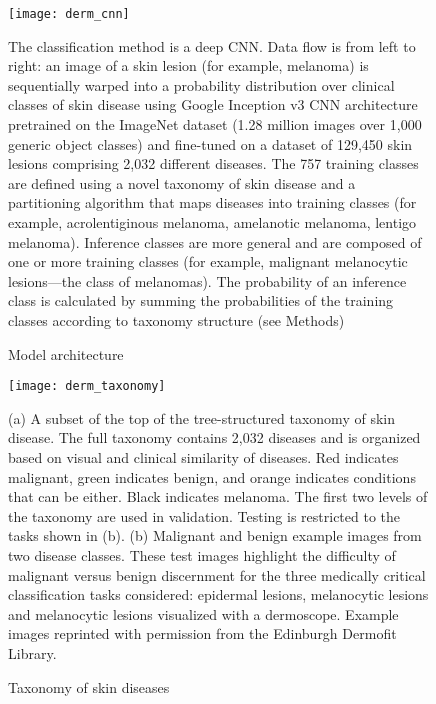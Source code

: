 \begin{figure}
\texttt{[image: derm\_cnn]}
\caption{Model architecture}
\vspace{12px}
The classification method is a deep CNN. Data flow is from left to right: an image of a skin lesion (for example, melanoma) is sequentially warped into a probability distribution over clinical classes of skin disease using Google Inception v3 CNN architecture pretrained on the ImageNet dataset (1.28 million images over 1,000 generic object classes) and fine-tuned on a dataset of 129,450 skin lesions comprising 2,032 different diseases. The 757 training classes are defined using a novel taxonomy of skin disease and a partitioning algorithm that maps diseases into training classes (for example, acrolentiginous melanoma, amelanotic melanoma, lentigo melanoma). Inference classes are more general and are composed of one or more training classes (for example, malignant melanocytic lesions—the class of melanomas). The probability of an inference class is calculated by summing the probabilities of the training classes according to taxonomy structure (see Methods)
\label{fig:derm_cnn}
\end{figure}

\begin{figure}
\texttt{[image: derm\_taxonomy]}
\caption{Taxonomy of skin diseases}
\vspace{12px}
(a) A subset of the top of the tree-structured taxonomy of skin disease. The full taxonomy contains 2,032 diseases and is organized based on visual and clinical similarity of diseases. Red indicates malignant, green indicates benign, and orange indicates conditions that can be either. Black indicates melanoma. The first two levels of the taxonomy are used in validation. Testing is restricted to the tasks shown in (b). (b) Malignant and benign example images from two disease classes. These test images highlight the difficulty of malignant versus benign discernment for the three medically critical classification tasks considered: epidermal lesions, melanocytic lesions and melanocytic lesions visualized with a dermoscope. Example images reprinted with permission from the Edinburgh Dermofit Library.
\label{fig:derm_taxonomy}
\end{figure}

